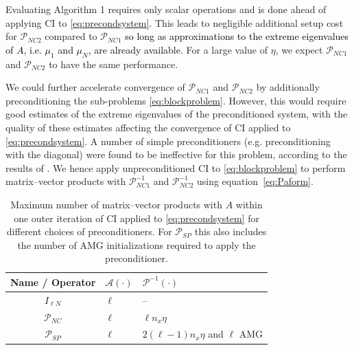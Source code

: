 \documentclass{article}
\newcommand{\jt}{\textcolor{black}}%
\newcommand{\resource}{\eta}
\theoremstyle{definition}
\begin{document}
{		
		Evaluating Algorithm 1 requires only scalar operations and is done ahead of applying CI to \eqref{eq:precondsystem}. This leads to negligible additional setup cost for $\mathcal{P}_{NC2}$ compared to $\mathcal{P}_{NC1}$ \jt{so long as approximations to the extreme eigenvalues of $A$, i.e. $\mu_1$ and $\mu_N$, are already available}.  For a large value of $\resource$,  we expect $\mathcal{P}_{NC1}$ and $\mathcal{P}_{NC2}$ to have the same performance. {We could further accelerate convergence of $\mathcal{P}_{NC1}$ and $\mathcal{P}_{NC2}$ by additionally preconditioning the sub-problems \eqref{eq:blockproblem}. However, this would require good estimates of the extreme eigenvalues of the preconditioned system, with the quality of these estimates affecting the convergence of CI applied to \eqref{eq:precondsystem}. A number of simple preconditioners (e.g. preconditioning with the diagonal) were found to be ineffective for this problem, according to the results of \cite{weaver2018time}. We hence apply unpreconditioned CI to \eqref{eq:blockproblem} to perform matrix--vector products with $\mathcal{P}_{NC1}^{-1}$ and $\mathcal{P}_{NC2}^{-1}$ using equation~\eqref{eq:Paform}.
			
			\begin{table}[ht]
				\centering
				\begin{tabular}{c|ll}
					Name {/ Operator} & $\mathcal{A}(\cdot)$ & $\mathcal{P}^{-1}(\cdot)$  \\ \hline
					$I_{\ell N}$ & $\ell$ & --  \\
					$\mathcal{P}_{NC}$ & $\ell$ & $\ell n_x  \resource$ \\
					$\mathcal{P}_{SP}$ & $\ell$ & ${2(\ell-1) }n_x  \resource$ and $\ell$ AMG 
				\end{tabular}
				\caption{{Maximum number of matrix--vector products with $A$  within} one outer iteration of CI applied to \eqref{eq:precondsystem} for different choices of preconditioners. For $\mathcal{P}_{SP}$ this {also includes} the  number of AMG initializations required to apply the preconditioner.}
				\label{tab:compbud}
			\end{table}
			
			
			
			\begin{algorithm}[ht]
				\caption{Algorithm for assigning iteration resource unevenly across sub-problems, according to the upper bound on the asymptotic convergence factor given in Theorem \ref{thm:convergence}}\label{alg:AssignIterations}
				

\end{algorithm}}}
\end{document}
